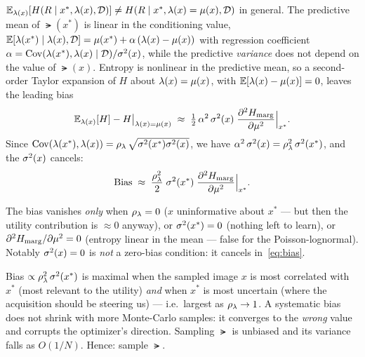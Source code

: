 \begin{proposition}\label{prop:bias}
$\mathbb{E}_{\lambda(x)}[H(R\mid x^{*},\lambda(x),\mathcal D)]\neq H(R\mid x^{*},\lambda(x)=\mu(x),\mathcal D)$
in general. The predictive mean of $\lat(x^{*})$ is linear in the conditioning
value, $\mathbb{E}[\lambda(x^{*})\mid\lambda(x),\mathcal D]=\mu(x^{*})+\alpha\,(\lambda(x)-\mu(x))$
with regression coefficient $\alpha=\mathrm{Cov}(\lambda(x^{*}),\lambda(x)\mid\mathcal D)/\sigma^{2}(x)$,
while the predictive \emph{variance} does not depend on the value of $\lat(x)$.
Entropy is nonlinear in the predictive mean, so a second-order Taylor expansion of
$H$ about $\lambda(x)=\mu(x)$, with $\mathbb{E}[\lambda(x)-\mu(x)]=0$, leaves the leading
bias
%
\begin{equation}
  \mathbb{E}_{\lambda(x)}[H] - H\big|_{\lambda(x)=\mu(x)}
  \;\approx\; \tfrac12\,\alpha^{2}\,\sigma^{2}(x)\;\frac{\partial^{2}H_{\mathrm{marg}}}{\partial\mu^{2}}\Big|_{x^{*}} .
  \label{eq:bias-raw}
\end{equation}
%
Since $\mathrm{Cov}(\lambda(x^{*}),\lambda(x))=\rho_{\lambda}\,\sqrt{\sigma^{2}(x^{*})\sigma^{2}(x)}$, we
have $\alpha^{2}\,\sigma^{2}(x)=\rho_{\lambda}^{2}\,\sigma^{2}(x^{*})$, and the $\sigma^{2}(x)$ cancels:
%
\begin{equation}
  \mathrm{Bias} \;\approx\; \frac{\rho_{\lambda}^{2}}{2}\;\sigma^{2}(x^{*})\;\frac{\partial^{2}H_{\mathrm{marg}}}{\partial\mu^{2}}\Big|_{x^{*}} .
  \label{eq:bias}
\end{equation}
\end{proposition}

The bias vanishes \emph{only} when $\rho_{\lambda}=0$ ($x$ uninformative about $x^{*}$ ---
but then the utility contribution is $\approx0$ anyway), or $\sigma^{2}(x^{*})=0$
(nothing left to learn), or $\partial^{2}H_{\mathrm{marg}}/\partial\mu^{2}=0$ (entropy
linear in the mean --- false for the Poisson-lognormal). Notably $\sigma^{2}(x)=0$ is
\emph{not} a zero-bias condition: it cancels in~\eqref{eq:bias}.

\begin{remark}\label{rem:bias-matters}
Bias $\propto\rho_{\lambda}^{2}\,\sigma^{2}(x^{*})$ is maximal when the sampled image $x$ is most
correlated with $x^{*}$ (most relevant to the utility) \emph{and} when $x^{*}$ is
most uncertain (where the acquisition should be steering us) --- i.e.\ largest as
$\rho_{\lambda}\to1$. A systematic bias does not shrink with more Monte-Carlo samples: it
converges to the \emph{wrong} value and corrupts the optimizer's direction.
Sampling $\lat$ is unbiased and its variance falls as $O(1/N)$. Hence: sample
$\lat$.
\end{remark}

